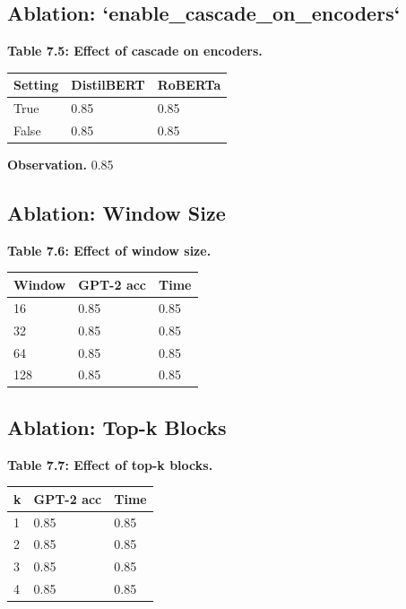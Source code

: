 \subsection{Ablation: `enable\_cascade\_on\_encoders`}

\textbf{Table 7.5: Effect of cascade on encoders.}

\begin{table}[H]
\centering
\small
\begin{tabular}{lll}
\toprule
\textbf{Setting} & \textbf{DistilBERT} & \textbf{RoBERTa} \\
\midrule
True & 0.85 & 0.85 \\
False & 0.85 & 0.85 \\
\bottomrule
\end{tabular}
\end{table}

\textbf{Observation.} 0.85

\subsection{Ablation: Window Size}

\textbf{Table 7.6: Effect of window size.}

\begin{table}[H]
\centering
\small
\begin{tabular}{lll}
\toprule
\textbf{Window} & \textbf{GPT-2 acc} & \textbf{Time} \\
\midrule
16 & 0.85 & 0.85 \\
32 & 0.85 & 0.85 \\
64 & 0.85 & 0.85 \\
128 & 0.85 & 0.85 \\
\bottomrule
\end{tabular}
\end{table}

\subsection{Ablation: Top-k Blocks}

\textbf{Table 7.7: Effect of top-k blocks.}

\begin{table}[H]
\centering
\small
\begin{tabular}{lll}
\toprule
\textbf{k} & \textbf{GPT-2 acc} & \textbf{Time} \\
\midrule
1 & 0.85 & 0.85 \\
2 & 0.85 & 0.85 \\
3 & 0.85 & 0.85 \\
4 & 0.85 & 0.85 \\
\bottomrule
\end{tabular}
\end{table}

